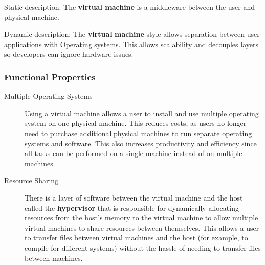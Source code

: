 \begin{summary}
    Static description: The {\bf virtual machine} is a middleware between the
    user and physical machine.

    Dynamic description: The {\bf virtual machine} style allows separation
    between user applications with Operating systems. This allows scalability
    and decouples layers so developers can ignore hardware issues.
\end{summary}

\subsubsection{Functional Properties}
\begin{description}
    \item[Multiple Operating Systems] Using a virtual machine
        allows a user to install and use multiple operating system on one
        physical machine. This reduces costs, as users no longer need to
        purchase additional physical machines to run separate operating systems
        and software. This also increases productivity and efficiency since all
        tasks can be performed on a single machine instead of on multiple
        machines.

    \item[Resource Sharing] There is a layer of software between the virtual
        machine and the host called the {\bf hypervisor} that is responsible
        for dynamically allocating resources from the host's memory to the
        virtual machine to allow multiple virtual machines to share
        resources between themselves. This allows a user to transfer files
        between virtual machines and the host (for example, to compile for
        different systems) without the hassle of needing to transfer files
        between machines.
\end{description}

